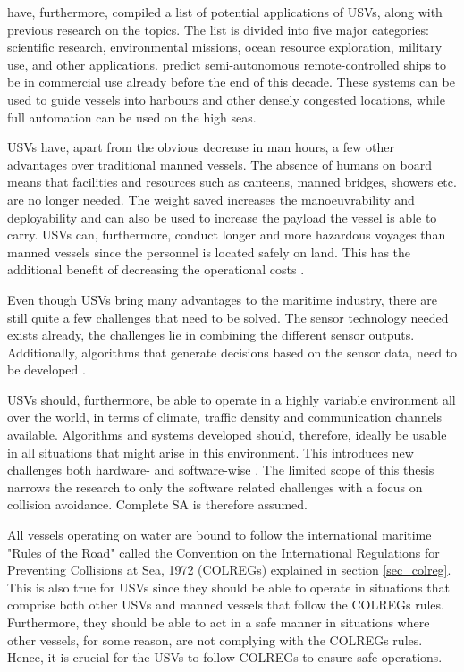 \textcite{liu2016unmanned} have, furthermore, compiled a list of potential applications of USVs, along with previous research on the topics.
The list is divided into five major categories: scientific research, environmental missions, ocean resource exploration, military use, and other applications.
\textcite{jokioinen2016remote} predict semi-autonomous remote-controlled ships to be in commercial use already before the end of this decade. These systems can be used to guide vessels into harbours and other densely congested locations, while full automation can be used on the high seas.

USVs have, apart from the obvious decrease in man hours, a few other advantages over traditional manned vessels. The absence of humans on board means that facilities and resources such as canteens,  manned bridges, showers etc. are no longer needed. The weight saved increases the manoeuvrability and deployability and can also be used to increase the payload the vessel is able to carry. USVs can, furthermore, conduct longer and more hazardous voyages than manned vessels since the personnel is located safely on land. This has the additional benefit of decreasing the operational costs \cite{liu2016unmanned,jokioinen2016remote}.



Even though USVs bring many advantages to the maritime industry, there are still quite a few challenges that need to be solved. The sensor technology needed exists already, the challenges lie in combining the different sensor outputs. Additionally, algorithms that generate decisions based on the sensor data, need to be developed \cite{jokioinen2016remote}.

USVs should, furthermore, be able to operate in a highly variable environment all over the world, in terms of climate, traffic density and communication channels available.  Algorithms and systems developed should, therefore, ideally be usable in all situations that might arise in this environment. This introduces new challenges both hardware- and software-wise \cite{liu2016unmanned}. The limited scope of this thesis narrows the research to only the software related challenges with a focus on collision avoidance. Complete SA is therefore assumed.

All vessels operating on water are bound to follow the international maritime "Rules of the Road" called the Convention on the International Regulations for Preventing Collisions at Sea, 1972 (COLREGs) explained in section \ref{sec_colreg}. This is also true for USVs since they should be able to operate in situations that comprise both other USVs and manned vessels that follow the COLREGs rules. Furthermore, they should be able to  act in a safe manner in situations where other vessels, for some reason, are not complying with the COLREGs rules. Hence, it is crucial for the USVs to follow COLREGs to ensure safe operations.

